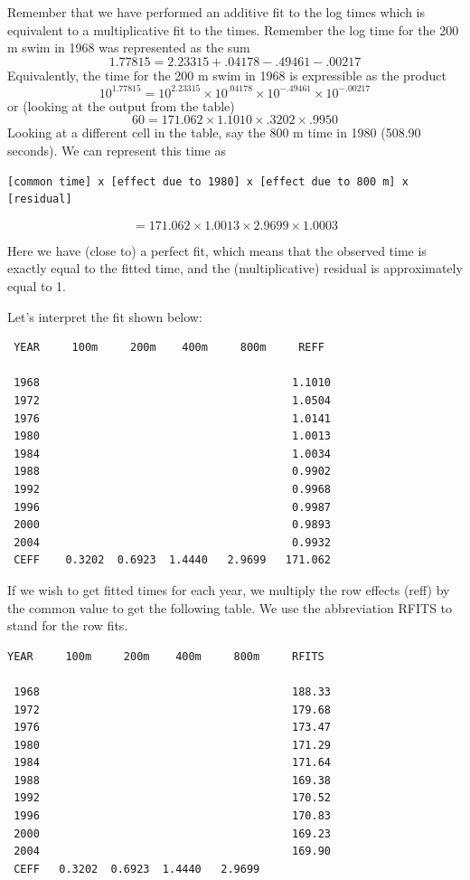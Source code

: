 \documentclass[
]{book}
\begin{document}
Remember that we have performed an additive fit to the log times which is equivalent to a multiplicative fit to the times. Remember the log time for the 200 m swim in 1968 was represented as the sum
\[
1.77815 = 2.23315 + .04178 - .49461 - .00217
\]
Equivalently, the time for the 200 m swim in 1968 is expressible as the product
\[
10^{1.77815} = 10^{2.23315} \times 10^{.04178}  \times 10^{- .49461}
\times 10^{-.00217}
\]
or (looking at the output from the table)
\[
60 = 171.062 \times 1.1010 \times .3202 \times .9950
\]
Looking at a different cell in the table, say the 800 m time in 1980 (508.90 seconds). We can represent this time as

\begin{verbatim}
[common time] x [effect due to 1980] x [effect due to 800 m] x [residual]
\end{verbatim}

\[
= 171.062 \times 1.0013 \times 2.9699 \times 1.0003
\]

Here we have (close to) a perfect fit, which means that the observed time is exactly equal to the fitted time, and the (multiplicative) residual is approximately equal to 1.

Let's interpret the fit shown below:

\begin{verbatim}
 YEAR     100m     200m    400m     800m     REFF
  
 1968                                       1.1010 
 1972                                       1.0504 
 1976                                       1.0141 
 1980                                       1.0013 
 1984                                       1.0034 
 1988                                       0.9902 
 1992                                       0.9968 
 1996                                       0.9987 
 2000                                       0.9893 
 2004                                       0.9932
 CEFF    0.3202  0.6923  1.4440   2.9699   171.062
\end{verbatim}

If we wish to get fitted times for each year, we multiply the row effects (reff) by the common value to get the following table. We use the abbreviation RFITS to stand for the row fits.

\begin{verbatim}
YEAR     100m     200m    400m     800m     RFITS
  
 1968                                       188.33
 1972                                       179.68
 1976                                       173.47
 1980                                       171.29
 1984                                       171.64
 1988                                       169.38
 1992                                       170.52
 1996                                       170.83
 2000                                       169.23
 2004                                       169.90
 CEFF   0.3202  0.6923  1.4440   2.9699   
\end{verbatim}
\end{document}
